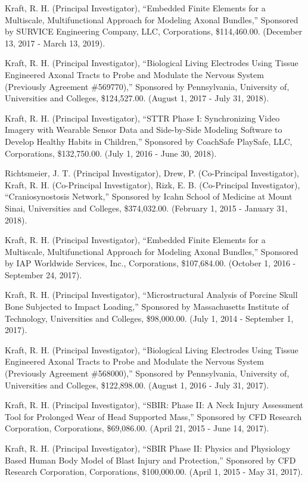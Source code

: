 \documentclass[11pt]{article}
\begin{document}
Kraft, R. 
H. 
(Principal Investigator), ``Embedded Finite Elements for a
Multiscale, Multifunctional Approach for Modeling Axonal Bundles,''
Sponsored by SURVICE Engineering Company, LLC, Corporations,
\$114,460.00. 
(December 13, 2017 - March 13, 2019).

Kraft, R. 
H. 
(Principal Investigator), ``Biological Living Electrodes
Using Tissue Engineered Axonal Tracts to Probe and Modulate the Nervous
System (Previously Agreement \#569770),'' Sponsored by Pennsylvania,
University of, Universities and Colleges, \$124,527.00. 
(August 1, 2017
- July 31, 2018).

Kraft, R. 
H. 
(Principal Investigator), ``STTR Phase I: Synchronizing
Video Imagery with Wearable Sensor Data and Side-by-Side Modeling
Software to Develop Healthy Habits in Children,'' Sponsored by CoachSafe
PlaySafe, LLC, Corporations, \$132,750.00. 
(July 1, 2016 - June 30,
2018).

Richtsmeier, J. 
T. 
(Principal Investigator), Drew, P. 
(Co-Principal
Investigator), Kraft, R. 
H. 
(Co-Principal Investigator), Rizk, E. 
B.
(Co-Principal Investigator), ``Craniosynostosis Network,'' Sponsored by
Icahn School of Medicine at Mount Sinai, Universities and Colleges,
\$374,032.00. 
(February 1, 2015 - January 31, 2018).

Kraft, R. 
H. 
(Principal Investigator), ``Embedded Finite Elements for a
Multiscale, Multifunctional Approach for Modeling Axonal Bundles,''
Sponsored by IAP Worldwide Services, Inc., Corporations, \$107,684.00.
(October 1, 2016 - September 24, 2017).

Kraft, R. 
H. 
(Principal Investigator), ``Microstructural Analysis of
Porcine Skull Bone Subjected to Impact Loading,'' Sponsored by
Massachusetts Institute of Technology, Universities and Colleges,
\$98,000.00. 
(July 1, 2014 - September 1, 2017).

Kraft, R. 
H. 
(Principal Investigator), ``Biological Living Electrodes
Using Tissue Engineered Axonal Tracts to Probe and Modulate the Nervous
System (Previously Agreement \#568000),'' Sponsored by Pennsylvania,
University of, Universities and Colleges, \$122,898.00. 
(August 1, 2016
- July 31, 2017).

Kraft, R. 
H. 
(Principal Investigator), ``SBIR: Phase II: A Neck Injury
Assessment Tool for Prolonged Wear of Head Supported Mass,'' Sponsored by
CFD Research Corporation, Corporations, \$69,086.00. 
(April 21, 2015 -
June 14, 2017).

Kraft, R. 
H. 
(Principal Investigator), ``SBIR Phase II: Physics and
Physiology Based Human Body Model of Blast Injury and Protection,''
Sponsored by CFD Research Corporation, Corporations, \$100,000.00.
(April 1, 2015 - May 31, 2017).
\end{document}
